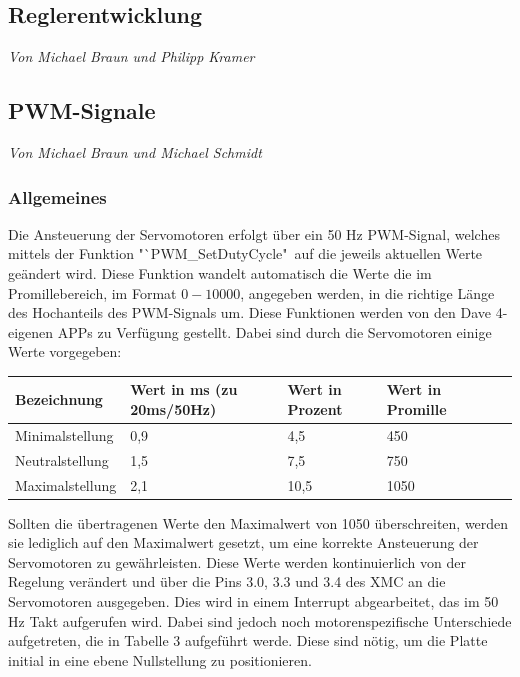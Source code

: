 \documentclass[12pt,a4paper,bibliography=totoc,listof=totoc]{scrartcl}
\begin{document}
\subsection{Reglerentwicklung}
\textit{Von Michael Braun und Philipp Kramer}\newline

\subsection{PWM-Signale}
\textit{Von Michael Braun und Michael Schmidt}\newline
\subsubsection{ Allgemeines}
Die Ansteuerung der Servomotoren erfolgt über ein 50 Hz PWM-Signal, welches mittels der Funktion 
"`PWM\_SetDutyCycle"\, auf die jeweils aktuellen Werte geändert wird. Diese Funktion wandelt automatisch 
die Werte die im Promillebereich, im Format $0-10000$, angegeben werden, in die richtige Länge des 
Hochanteils des PWM-Signals um. Diese Funktionen werden von den Dave 4- eigenen APPs zu Verfügung 
gestellt. Dabei sind durch die Servomotoren einige Werte vorgegeben:

\begin{tabularx}{\textwidth}{p{}|X|X|X|X|X|}
\hline
 Bezeichnung 		& Wert in ms (zu 20ms/50Hz) & Wert in Prozent 	& Wert in Promille \\
\hline
 Minimalstellung		& 0,9						& 4,5				& 450 \\
\hline
 Neutralstellung		& 1,5						& 7,5				& 750 \\
\hline
 Maximalstellung		&2,1						& 10,5				& 1050\\
\hline
\end{tabularx}
\newline
Sollten die übertragenen Werte den Maximalwert von 1050 überschreiten, werden sie lediglich auf den 
Maximalwert gesetzt, um eine korrekte Ansteuerung der Servomotoren zu gewährleisten. Diese Werte werden 
kontinuierlich von der Regelung verändert und über die Pins 3.0, 3.3 und 3.4 des XMC an die Servomotoren 
ausgegeben. Dies wird in einem Interrupt abgearbeitet, das im 50 Hz Takt aufgerufen wird. Dabei sind jedoch 
noch motorenspezifische Unterschiede aufgetreten, die in Tabelle 3 aufgeführt werde. Diese sind nötig, um 
die Platte initial in eine ebene Nullstellung zu positionieren.
\end{document}
